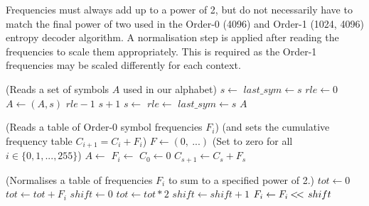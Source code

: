 \documentclass[a4paper]{article}
\begin{document}
Frequencies must always add up to a power of 2, but do not necessarily
have to match the final power of two used in the Order-0 (4096) and
Order-1 (1024, 4096) entropy decoder algorithm.  A normalisation step is
applied after reading the frequencies to scale them appropriately.
This is required as the Order-1 frequencies may be scaled differently
for each context.

\begin{algorithmic}[1]
\Statex (Reads a set of symbols $A$ used in our alphabet)
\State $s \gets$ 
\State $last\_sym \gets s$
\State $rle \gets 0$
\Repeat
  \State $A \gets (A,s)$ 
    \settowidth{\maxwidth}{rle\ }
    \State {} $rle-1$
    \State {} $s+1$
  \Else
    \State $s \gets$ 
      \State $rle \gets$ 
    \EndIf
  \EndIf
  \State $last\_sym \gets s$
\State \Return $A$
\EndFunction
\end{algorithmic}

\vskip 0.5cm

\begin{algorithmic}[1]
\Statex (Reads a table of Order-0 symbol frequencies $F_i$)
\Statex (and sets the cumulative frequency table $C_{i+1} = C_i+F_i$)
\State $F \gets (0,\ ...)$ \Comment(Set to zero for all $i \in \{0, 1,
  ..., 255\}$)
\State $A \gets$ 
  \State $F_i \gets$ 
\EndForeach
\State
\State {}
\State
\State $C_0 \gets 0$
  \State $C_{s+1} \gets C_s + F_s$
\EndFor
\EndProcedure
\end{algorithmic}

\begin{algorithmic}[1]
\Statex (Normalises a table of frequencies $F_i$ to sum to a specified power of 2.)
\State $tot \gets 0$
  \State $tot \gets tot + F_i$
\EndFor
{}
  \State \Return
\EndIf
\State
\State $shift \gets 0$
  \State $tot \gets tot*2$
  \State $shift \gets shift+1$
\EndWhile
\State
{}
  \State $F_i \gets F_i \mathbin{<\mkern-3mu<\,} shift$
\EndFor
\EndProcedure
\end{algorithmic}
\end{document}
